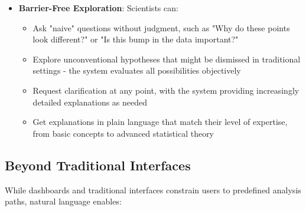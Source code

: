 \documentclass[11pt,a4paper]{article}
\begin{document}
\begin{itemize}
    \item \textbf{Barrier-Free Exploration}: Scientists can:
    \begin{itemize}
        \item Ask "naive" questions without judgment, such as "Why do these points look different?" or "Is this bump in the data important?"
        \item Explore unconventional hypotheses that might be dismissed in traditional settings - the system evaluates all possibilities objectively
        \item Request clarification at any point, with the system providing increasingly detailed explanations as needed
        \item Get explanations in plain language that match their level of expertise, from basic concepts to advanced statistical theory
    \end{itemize}
\end{itemize}

\subsection{Beyond Traditional Interfaces}
While dashboards and traditional interfaces constrain users to predefined analysis paths, natural language enables:
\end{document}
